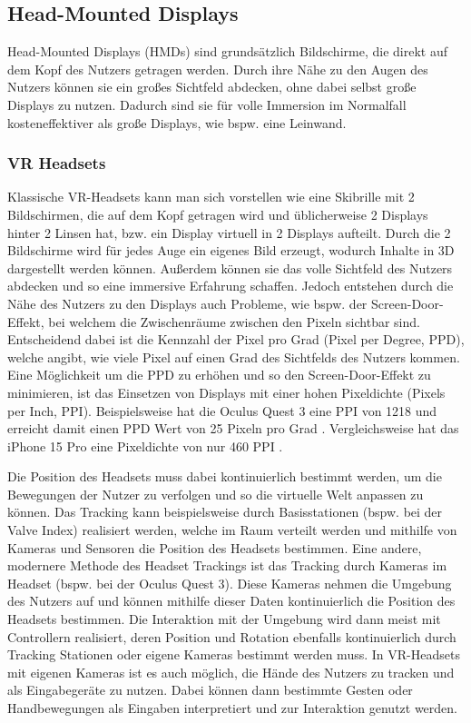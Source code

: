   \subsection{Head-Mounted Displays}
    Head-Mounted Displays (HMDs) sind grundsätzlich Bildschirme, die direkt auf dem Kopf des Nutzers getragen werden.
    Durch ihre Nähe zu den Augen des Nutzers können sie ein großes Sichtfeld abdecken, ohne dabei selbst große Displays zu nutzen.
    Dadurch sind sie für volle Immersion im Normalfall kosteneffektiver als große Displays, wie bspw. eine Leinwand.


    \subsubsection{VR Headsets}

    Klassische VR-Headsets kann man sich vorstellen wie eine Skibrille mit 2 Bildschirmen, die auf dem Kopf getragen wird und üblicherweise 2 Displays hinter 2 Linsen hat, bzw. ein Display virtuell in 2 Displays aufteilt.
    Durch die 2 Bildschirme wird für jedes Auge ein eigenes Bild erzeugt, wodurch Inhalte in 3D dargestellt werden können.
    Außerdem können sie das volle Sichtfeld des Nutzers abdecken und so eine immersive Erfahrung schaffen.
    Jedoch entstehen durch die Nähe des Nutzers zu den Displays auch Probleme, wie bspw. der Screen-Door-Effekt, bei welchem die Zwischenräume zwischen den Pixeln sichtbar sind.
    Entscheidend dabei ist die Kennzahl der Pixel pro Grad (Pixel per Degree, PPD), welche angibt, wie viele Pixel auf einen Grad des Sichtfelds des Nutzers kommen.
    Eine Möglichkeit um die PPD zu erhöhen und so den Screen-Door-Effekt zu minimieren, ist das Einsetzen von Displays mit einer hohen Pixeldichte (Pixels per Inch, PPI).
    Beispielsweise hat die Oculus Quest 3 eine PPI von 1218 und erreicht damit einen PPD Wert von 25 Pixeln pro Grad \autocite[]{meta-quest-3}.
    Vergleichsweise hat das iPhone 15 Pro eine Pixeldichte von nur 460 PPI \autocite[]{iPhone15Pro-datenblatt}.

    Die Position des Headsets muss dabei kontinuierlich bestimmt werden, um die Bewegungen der Nutzer zu verfolgen und so die virtuelle Welt anpassen zu können.
    Das Tracking kann beispielsweise durch Basisstationen (bspw. bei der Valve Index) realisiert werden, welche im Raum verteilt werden und mithilfe von Kameras und Sensoren die Position des Headsets bestimmen.
    Eine andere, modernere Methode des Headset Trackings ist das Tracking durch Kameras im Headset (bspw. bei der Oculus Quest 3).
    Diese Kameras nehmen die Umgebung des Nutzers auf und können mithilfe dieser Daten kontinuierlich die Position des Headsets bestimmen.
    Die Interaktion mit der Umgebung wird dann meist mit Controllern realisiert, deren Position und Rotation ebenfalls kontinuierlich durch Tracking Stationen oder eigene Kameras bestimmt werden muss.
    In VR-Headsets mit eigenen Kameras ist es auch möglich, die Hände des Nutzers zu tracken und als Eingabegeräte zu nutzen.
    Dabei können dann bestimmte Gesten oder Handbewegungen als Eingaben interpretiert und zur Interaktion genutzt werden.
    
